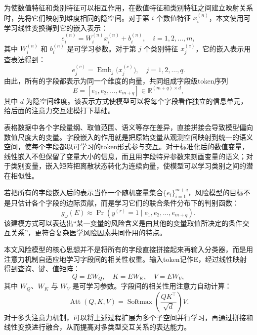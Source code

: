为使数值特征和类别特征可以相互作用，在数值特征和类别特征之间建立映射关系时，先将它们映射到维度相同的隐空间。对于第 $i$ 个数值特征 $x_i^{(n)}$，本文使用可学习线性变换得到它的嵌入表示：
\begin{equation}
e_i^{(n)} = W_i^{(n)} x_i^{(n)} + b_i^{(n)}, \quad i=1,2,\ldots,m,
\label{eq:numerical-embed1}
\end{equation}
其中 $W_i^{(n)}$ 和 $b_i^{(n)}$ 是可学习参数。对于第 $j$ 个类别特征 $x_j^{(c)}$，它的嵌入表示用查表法得到：
\begin{equation}
e_j^{(c)} = \operatorname{Emb}_j\bigl(x_j^{(c)}\bigr), \quad j=1,2,\ldots,q.
\label{eq:categorical-embed2}
\end{equation}
由此，所有的字段都表示为同一个维度的向量，共同组成字段级token序列
\begin{equation}
E = [e_1,e_2,\ldots,e_{m+q}]\in\mathbb{R}^{(m+q)\times d},
\label{eq:token-sequence}
\end{equation}
其中 $d$ 为隐空间维度。该表示方式使模型可以将每个字段看作独立的信息单元，给后面的注意力交互建模打下基础。

表格数据中各个字段量纲、取值范围、语义等存在差异，直接拼接会导致模型偏向数值尺度大的变量。字段嵌入的作用就是把原始变量从观测空间映射到统一的语义空间，使每个字段都以可学习的token形式参与交互。对于标准化后的数值变量，线性嵌入不但保留了变量大小的信息，而且用字段特异参数来刻画变量的语义；对于类别变量，嵌入矩阵把离散状态转化为连续向量，使模型可以学习类别之间的潜在相似性。

若把所有的字段嵌入后的表示当作一个随机变量集合$\{e_i\}_{i=1}^{m+q}$，风险模型的目标不是只估计各个字段的边际贡献，而是学习它们的联合条件分布下的判别函数：
\begin{equation}
g_{\omega}(E)\approx \Pr(y^{(r)}=1\mid e_1,e_2,\ldots,e_{m+q}).
\label{eq:risk-joint-dist}
\end{equation}
该建模方式可以表达出“某一变量的风险含义是由其他的变量取值所决定的条件交互关系”，更符合复杂医学风险因素共同作用的特点。

本文风险模型的核心思想并不是将所有的字段直接拼接起来再输入分类器，而是用注意力机制自适应地学习字段间的相关性权重。输入token记作E，经过线性映射得到查询、键、值矩阵：
\begin{equation}
Q=EW_Q,\quad K=EW_K,\quad V=EW_V,
\label{eq:attention-qkv}
\end{equation}
其中 $W_Q$、$W_K$ 与 $W_V$ 是可学习参数。字段间的相关性用注意力自动计算：
\begin{equation}
\operatorname{Att}(Q,K,V)=\operatorname{Softmax}\left(\frac{QK^{\top}}{\sqrt{d}}\right)V.
\label{eq:attention-formula}
\end{equation}
对于多头注意力机制，可以将上述过程扩展为多个子空间并行学习，再通过拼接和线性变换进行融合，从而提高对多类型交互关系的表达能力。

